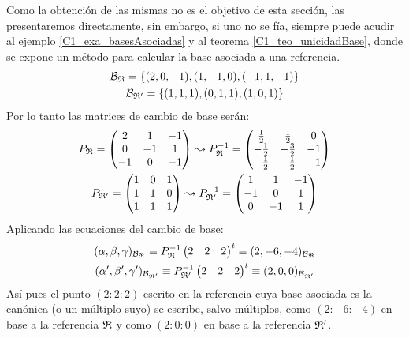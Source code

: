 \begin{exa}
	Como la obtención de las mismas no es el objetivo de esta sección, las presentaremos directamente, sin embargo, si uno no se fía, siempre puede acudir al ejemplo \ref{C1_exa_basesAsociadas} y al teorema \ref{C1_teo_unicidadBase}, donde se expone un método para calcular la base asociada a una referencia.
	\begin{gather*}
		\mathcal{B}_{\mathfrak{R}}=\{(2,0,-1),(1,-1,0),(-1,1,-1)\}\\
		\mathcal{B}_{\mathfrak{R}'}=\{(1,1,1),(0,1,1),(1,0,1)\}
	\end{gather*}
	Por lo tanto las matrices de cambio de base serán:
	\begin{gather*}
			P_{\mathfrak{R}}=\begin{pmatrix}
				2 & 1 & -1\\
				0 & -1 & 1\\
				-1 & 0 & -1
			\end{pmatrix}\leadsto P_{\mathfrak{R}}^{-1}=\begin{pmatrix}
			\frac{1}{2} & \frac{1}{2} & 0 \\
			-\frac{1}{2} & -\frac{3}{2} & -1 \\
			-\frac{1}{2} & -\frac{1}{2} & -1
		\end{pmatrix}\\
			P_{\mathfrak{R}'}=\begin{pmatrix}
				1 & 0 & 1\\
				1 & 1 & 0\\
				1 & 1 & 1
			\end{pmatrix}\leadsto P_{\mathfrak{R}'}^{-1}=\begin{pmatrix}
			1 & 1 & -1 \\
			-1 & 0 & 1 \\
			0 & -1 & 1
		\end{pmatrix}
	\end{gather*}
	Aplicando las ecuaciones del cambio de base:
	\begin{gather*}
		(\alpha,\beta,\gamma)_{\mathcal{B}_{\mathfrak{R}}}\equiv P_{\mathfrak{R}}^{-1}\begin{pmatrix}
			2 & 2 & 2
		\end{pmatrix}^t\equiv(2,-6,-4)_{\mathcal{B}_{\mathfrak{R}}}\\
		(\alpha',\beta',\gamma')_{\mathcal{B}_{\mathfrak{R}'}}\equiv P_{\mathfrak{R}'}^{-1}\begin{pmatrix}
			2 & 2 & 2
		\end{pmatrix}^t\equiv (2,0,0)_{\mathcal{B}_{\mathfrak{R}'}}
	\end{gather*}
	Así pues el punto $(2:2:2)$ escrito en la referencia cuya base asociada es la canónica (o un múltiplo suyo) se escribe, salvo múltiplos, como $(2:-6:-4)$ en base a la referencia $\mathfrak{R}$ y como $(2:0:0)$ en base a la referencia $\mathfrak{R}'$.
	

\end{exa}
